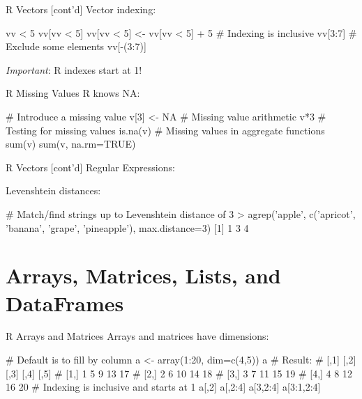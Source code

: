 \documentclass[ignorenonframetext,xcolor=x11names]{beamer}
\begin{document}
\begin{frame}[label=full,fragile]{R Vectors \small [cont'd]}
Vector indexing:
\begin{Rcode}
vv < 5
vv[vv < 5]
vv[vv < 5] <- vv[vv < 5] + 5
# Indexing is inclusive
vv[3:7]
# Exclude some elements
vv[-(3:7)]
\end{Rcode}

\emph{Important}: R indexes start at 1!

\end{frame}

\begin{frame}[label=full,fragile]{R Missing Values}
R knows NA:
\begin{Rcode}
# Introduce a missing value
v[3] <- NA
# Missing value arithmetic
v*3
# Testing for missing values
is.na(v)
# Missing values in aggregate functions
sum(v)
sum(v, na.rm=TRUE)
\end{Rcode}
\end{frame}

\begin{frame}[label=full,fragile]{R Vectors \small [cont'd]}
Regular Expressions:
\footnotesize
{}
\normalsize
Levenshtein distances:
\footnotesize
\begin{Rcode}
# Match/find strings up to Levenshtein distance of 3
> agrep('apple', 
    c('apricot', 'banana', 'grape', 'pineapple'), 
    max.distance=3)
[1] 1 3 4
\end{Rcode}
\end{frame}

\section{Arrays, Matrices, Lists, and DataFrames}

\begin{frame}[label=full,fragile]{R Arrays and Matrices}
Arrays and matrices have dimensions:
\begin{Rcode}
# Default is to fill by column
a <- array(1:20, dim=c(4,5))
a
# Result:
#      [,1] [,2] [,3] [,4] [,5]
# [1,]    1    5    9   13   17
# [2,]    2    6   10   14   18
# [3,]    3    7   11   15   19
# [4,]    4    8   12   16   20
# Indexing is inclusive and starts at 1
a[,2]
a[,2:4]
a[3,2:4]
a[3:1,2:4]
\end{Rcode}
\end{frame}
\end{document}
